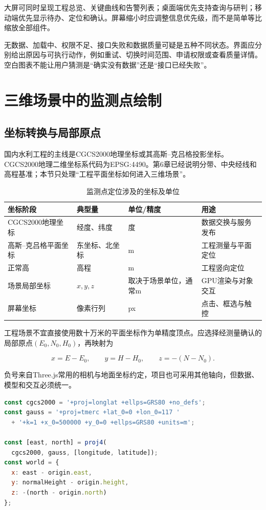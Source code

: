 大屏可同时呈现工程总览、关键曲线和告警列表；桌面端优先支持查询与研判；移动端优先显示待办、定位和确认。屏幕缩小时应调整信息优先级，而不是简单等比缩放全部组件。

无数据、加载中、权限不足、接口失败和数据质量可疑是五种不同状态。界面应分别给出原因与可执行动作，例如重试、切换时间范围、申请权限或查看质量详情。空白图表不能让用户猜测是“确实没有数据”还是“接口已经失败”。

\section{三维场景中的监测点绘制}\label{sec:3d-monitoring-rendering}

\subsection{坐标转换与局部原点}

国内水利工程的主线是CGCS2000地理坐标或其高斯--克吕格投影坐标。CGCS2000地理二维坐标系代码为EPSG:4490\cite{epsg4490}。第6章已经说明分带、中央经线和高程基准；本节只处理“工程平面坐标如何进入三维场景”。

\begin{table}[htbp]
\centering
\caption{监测点定位涉及的坐标及单位}
\label{tab:ch7-coordinate-units}
\begin{tabular}{p{3.0cm}p{3.1cm}p{3.2cm}p{3.2cm}}
\toprule
坐标阶段 & 典型量 & 单位/精度 & 用途 \\
\midrule
CGCS2000地理坐标 & 经度、纬度 & 度 & 数据交换与服务发布 \\
高斯--克吕格平面坐标 & 东坐标、北坐标 & m & 工程测量与平面定位 \\
正常高 & 高程 & m & 工程竖向定位 \\
场景局部坐标 & $x,y,z$ & 取决于场景单位，通常m & GPU渲染与对象交互 \\
屏幕坐标 & 像素行列 & px & 点击、框选与触控 \\
\bottomrule
\end{tabular}
\end{table}

工程场景不宜直接使用数十万米的平面坐标作为单精度顶点。应选择经测量确认的局部原点$(E_0,N_0,H_0)$，再映射为

\[
x=E-E_0,\qquad y=H-H_0,\qquad z=-(N-N_0).
\]

负号来自Three.js常用的相机与地面坐标约定，项目也可采用其他轴向，但数据、模型和交互必须统一。

\begin{lstlisting}[language=JavaScript,breaklines=true]
const cgcs2000 = '+proj=longlat +ellps=GRS80 +no_defs';
const gauss = '+proj=tmerc +lat_0=0 +lon_0=117 '
  + '+k=1 +x_0=500000 +y_0=0 +ellps=GRS80 +units=m';

const [east, north] = proj4(
  cgcs2000, gauss, [longitude, latitude]);
const world = {
  x: east - origin.east,
  y: normalHeight - origin.height,
  z: -(north - origin.north)
};
\end{lstlisting}

